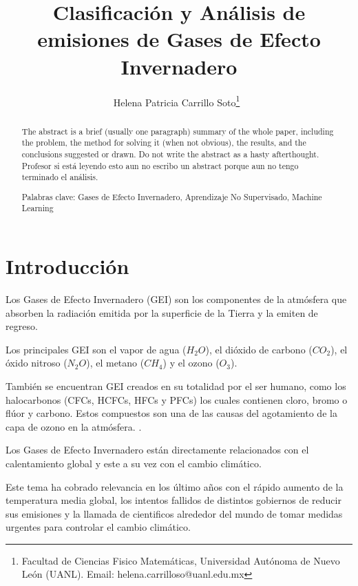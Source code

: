 \documentclass[13.6pt]{article}
\title{Clasificación y Análisis de emisiones de Gases de Efecto Invernadero}
\author{
Helena Patricia Carrillo Soto\thanks{Facultad de Ciencias Fisico Matemáticas, Universidad Autónoma de Nuevo León (UANL). Email: helena.carrilloso@uanl.edu.mx}\
}
\date{} %
\newcommand{\jhead}{Universidad Autónoma de Nuevo León}
\newcommand{\jdate}{Octubre 2023}
\begin{document}


\maketitle
\thispagestyle{firstpage}

\begin{abstract}

The abstract is a brief (usually one paragraph) summary
of the whole paper, including the problem, the method for solving
it (when not obvious), the results, and the conclusions suggested
or drawn.  Do not write the abstract as a hasty
afterthought. Profesor si está leyendo esto aun no escribo un abstract porque aun no tengo terminado el análisis.


\smallskip
\noindent
Palabras clave: Gases de Efecto Invernadero, Aprendizaje No Supervisado, Machine Learning
\end{abstract}


\setlength{\baselineskip}{16pt plus.2pt}

\section{Introducción}

Los Gases de Efecto Invernadero (GEI) son los componentes de la atmósfera que absorben la radiación emitida por la superficie de la Tierra y la emiten de regreso. 

Los principales GEI son el vapor de agua ($H_2O$), el dióxido de carbono ($CO_2$), el óxido nitroso ($N_2O$), el metano ($CH_4$) y el ozono ($O_3$). 

También se encuentran GEI creados en su totalidad por el ser humano, como los halocarbonos (CFCs, HCFCs, HFCs y PFCs) los cuales contienen cloro, bromo o flúor y carbono. Estos compuestos son una de las causas del agotamiento de la capa de ozono en la atmósfera. \citep{ballesteros2007informacion} .

Los Gases de Efecto Invernadero están directamente relacionados con el calentamiento global y este a su vez con el cambio climático. 

Este tema ha cobrado relevancia en los último años con el rápido aumento de la temperatura media global, los intentos fallidos de distintos gobiernos de reducir sus emisiones y la llamada de cientificos alrededor del mundo de tomar medidas urgentes para controlar el cambio climático.
\end{document}
